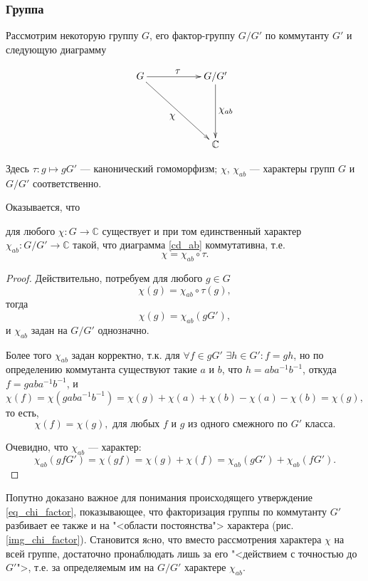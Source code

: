 \subsubsection{Группа}
    Рассмотрим некоторую группу $G$, его фактор-группу $G/G'$ по коммутанту 
    $G'$ и следующую диаграмму

    \begin{figure}[h]
        \centering
        \[\xymatrix{
            G \ar[rr]^{\textstyle{\tau}} \ar[rrdd]_{\textstyle{\chi}} & & G/G'\ar[dd]^{\textstyle{\chi_{ab}}} \\
            & & \\
            & & \mathbb{C}
        }\]
        \caption{}
        \label{cd_ab}
    \end{figure}

    Здесь $\tau: g \mapsto gG'$ --- канонический гомоморфизм; $\chi$, 
    $\chi_{ab}$ --- характеры групп $G$ и $G/G'$ соответственно.

    Оказывается, что 
    \begin{statement} для любого $\chi : G \to \mathbb{C}$ существует и при том 
        единственный характер $\chi_{ab} : G/G' \to \mathbb{C}$ такой, что диаграмма 
        \eqref{cd_ab} коммутативна, т.е. 
        \[\chi = \chi_{ab} \circ \tau.\]
    \end{statement}

    \begin{proof} Действительно, потребуем для любого $g \in G$
    \[\chi(g) = \chi_{ab} \circ \tau (g),\]
    тогда
    \[\chi(g) = \chi_{ab} (gG'),\]
    и $\chi_{ab}$ задан на $G/G'$ однозначно.

    Более того $\chi_{ab}$ задан корректно, т.к. для $\forall f \in gG'$ 
    $\exists h \in G': f = gh$, но по определению коммутанта существуют такие 
    $a$ и $b$, что $h = aba^{-1}b^{-1}$, откуда $f = gaba^{-1}b^{-1}$, и 
    \[\chi(f) = \chi(gaba^{-1}b^{-1}) 
    = \chi(g) + \chi(a) + \chi(b) - \chi(a) - \chi(b) = \chi(g),\]
    то есть,
    \begin{equation}\label{eq_chi_factor}
        \chi(f) = \chi(g),\text{ для любых $f$ и $g$ из одного смежного по $G'$ класса.}
    \end{equation}
    
    Очевидно, что $\chi_{ab}$ --- характер:
    \[\chi_{ab}(gf G') = \chi(gf) = \chi(g) + \chi(f) = \chi_{ab}(gG') + \chi_{ab}(fG').\]
    \end{proof}
    
    \begin{remark} Попутно доказано важное для понимания происходящего 
        утверждение \eqref{eq_chi_factor}, показывающее, что факторизация 
        группы по коммутанту $G'$ разбивает ее также и на "<области постоянства"> 
        характера (рис. \ref{img_chi_factor}). Становится яcно, что вместо 
        рассмотрения характера $\chi$ на всей группе, достаточно пронаблюдать 
        лишь за его "<действием с точностью до $G'$">, т.е. за определяемым им 
        на $G/G'$ характере $\chi_{ab}$.
    \end{remark}
    
